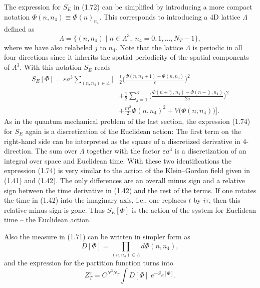 The expression for $S_E$ in (1.72) can be simplified by introducing a more
compact notation $\Phi(n, n_4) \equiv \Phi(n)_{n_4}$. This corresponds to
introducing a 4D lattice $\Lambda$ defined as
\begin{equation}
  \Lambda = \big\{(n, n_4)\;\big|\; n\in\Lambda^3,\;
    n_4 = 0, 1, \ldots, N_T - 1\big\},
\end{equation}
where we have also relabeled $j$ to $n_4$. Note that the lattice $\Lambda$ is
periodic in all four directions since it inherits the spatial periodicity of
the spatial components of $\Lambda^3$. With this notation $S_E$ reads
\begin{equation}
  \begin{split}
    S_E[\Phi] = \varepsilon a^3\sum_{(n,n_4)\in\Lambda}\Big[
    &\frac{1}{2}\Big(\frac{\Phi(n,n_4+1) - \Phi(n,n_4)}{\varepsilon}\Big)^2\\
    &+ \frac{1}{2}\sum_{j=1}^3
      \Big(\frac{\Phi(n+\hat{\jmath},n_4) - \Phi(n-\hat{\jmath},n_4)}{2a}\Big)^2\\
    &+ \frac{m^2}{2}\Phi(n,n_4)^2 + V\big(\Phi(n,n_4)\big)\Big].
  \end{split}
\end{equation}
As in the quantum mechanical problem of the last section, the expression (1.74)
for $S_E$ again is a discretization of the Euclidean action: The first term on
the right-hand side can be interpreted as the square of a discretized
derivative in 4-direction. The sum over $\Lambda$ together with the factor
$\varepsilon a^3$ is a discretization of an integral over space and Euclidean
time. With these two identifications the expression (1.74) is very similar to
the action of the Klein--Gordon field given in (1.41) and (1.42). The only
differences are an overall minus sign and a relative sign between the time
derivative in (1.42) and the rest of the terms. If one rotates the time in
(1.42) into the imaginary axis, i.e., one replaces $t$ by $i\tau$, then this
relative minus sign is gone. Thus $S_E[\Phi]$ is the action of the system for
Euclidean time -- the Euclidean action.

Also the measure in (1.71) can be written in simpler form as
\begin{equation}
  D[\Phi] = \prod_{(n,n_4)\in\Lambda}d\Phi(n,n_4),
\end{equation}
and the expression for the partition function turns into
\begin{equation}
  Z_T^\varepsilon = C^{N^3N_T}\int D[\Phi]\;e^{-S_E[\Phi]}.
\end{equation}


